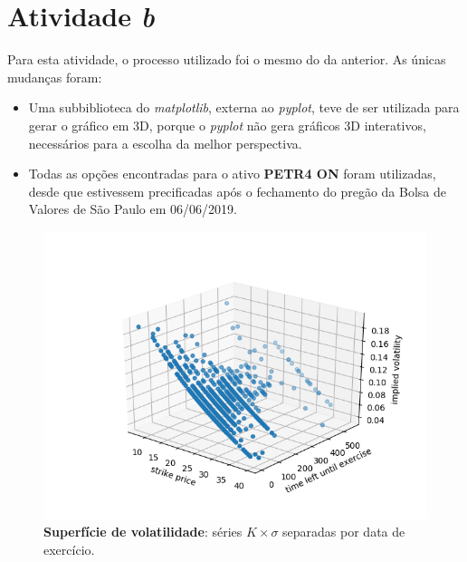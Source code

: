 \documentclass{article}
\begin{document}


\section*{Atividade \emph{b}}

Para esta atividade, o processo utilizado foi o mesmo do da anterior.
As únicas mudanças foram:

\begin{itemize}
	\item Uma subbiblioteca do \emph{matplotlib}, externa ao \emph{pyplot}, teve de ser utilizada para gerar o gráfico em 3D, porque o \emph{pyplot} não gera gráficos 3D interativos, necessários para a escolha da melhor perspectiva.
	\item Todas as opções encontradas para o ativo \textbf{PETR4 ON} foram utilizadas, desde que estivessem precificadas após o fechamento do pregão da Bolsa de Valores de São Paulo em 06/06/2019.
\end{itemize}

\begin{figure}[H]
	\includegraphics[width=\linewidth]{Figure_3.png}
	\centering
	
	\caption{\textbf{Superfície de volatilidade}: séries $K \times \sigma$ separadas por data de exercício.}
	\label{}
\end{figure}

\end{document}
